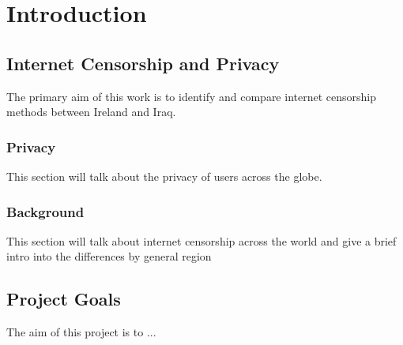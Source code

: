 \chapter{Introduction}

\section{Internet Censorship and Privacy}

The primary aim of this work is to identify and compare internet censorship methods between Ireland and Iraq. 

\subsection{Privacy}
This section will talk about the privacy of users across the globe.

\subsection{Background}

This section will talk about internet censorship across the world and give a brief intro into the differences by general region

\section{Project Goals}

The aim of this project is to ...

